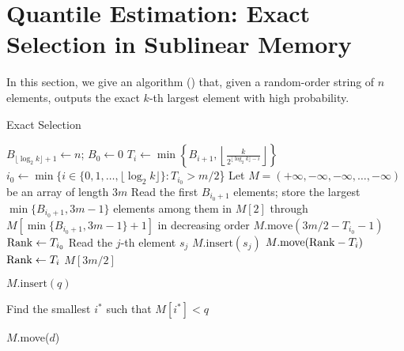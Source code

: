 \section{Quantile Estimation: Exact Selection in Sublinear Memory}
In this section, we give an algorithm () that, given a random-order string of $n$ elements, outputs the exact $k$-th largest element with high probability.

\begin{algorithm2e}
    \caption{Exact Selection}\label{alg:exact-selection}
    $B_{ \lfloor \log_2 k \rfloor + 1} \leftarrow n$; $B_0 \leftarrow 0$\;
     {$T_i \leftarrow \min\left\{B_{i+1},\left\lfloor\frac{k}{2^{ \lfloor\log_2 k\rfloor  - i}}\right\rfloor\right\}$}
    $i_0 \gets \min\{i \in \{0, 1, \ldots, \lfloor \log_2 k\rfloor\}: T_{i_0} > m/2$\}\;
    Let $M = (+\infty, -\infty, -\infty, \ldots, -\infty)$ be an array of length $3m$\;
    Read the first $B_{i_0 + 1}$ elements; store the largest $\min\{B_{i_0+1}, 3m-1\}$ elements among them in $M[2]$ through $M[\min\{B_{i_0+1}, 3m-1\}+1]$ in decreasing order\;\label{line:base-case}
    $M.\text{move}(3m/2 - T_{i_0} - 1)$\;\label{line:base-case-shift} 
    $\mathrm{Rank} \gets T_{i_0}$\;
     {
         {
            Read the $j$-th element $s_j$\;
            $M.\text{insert}(s_j)$\;
        }
        $M.\text{move}(\mathrm{Rank} - T_i)$\; \label{line:inductive-step-shift}
        $\mathrm{Rank} \gets T_i$\;
    }
    \Return $M[3m/2]$\;
\end{algorithm2e}

\begin{algorithm2e}
    \caption{$M.\text{insert}(q)$}
    Find the smallest $i^*$ such that $M[i^*] < q$\;
     
    \label{algorithm.insert}
\end{algorithm2e}

\begin{algorithm2e}
    \caption{$M$.move($d$)}
     {
    } 
  \label{algorithm.move}
\end{algorithm2e}

